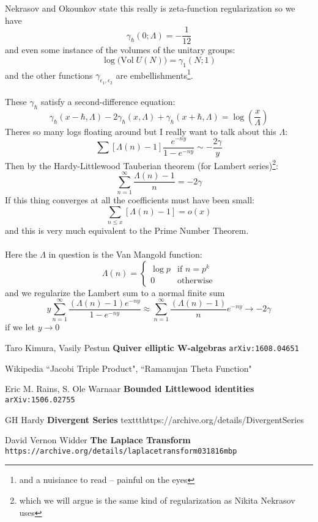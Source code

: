 \documentclass[12pt]{article}
\begin{document}
\noindent Nekrasov and Okounkov state this really is zeta-function regularization so we have
$$ \gamma_{\hbar}(0; \Lambda) = - \frac{1}{12} $$
and even some instance of the volumes of the unitary groups:
$$ \log \big( \text{Vol}\; U(N) \big) = \gamma_1(N; 1)$$ 
and the other functions $\gamma_{\epsilon_1, \epsilon_2}$ are embellishments\footnote{and a nuisiance to read -- painful on the eyes}. \\ \\
These $\gamma_\hbar$ satisfy a second-difference equation:
$$ \gamma_\hbar(x - \hbar, \Lambda  )
- 2\gamma_\hbar(x , \Lambda  )
+ \gamma_\hbar(x + \hbar, \Lambda  )
 = \log \left( \frac{x}{\Lambda} \right)$$
Theres so many logs floating around but I really want to talk about this $\Lambda$:
$$ \sum [\Lambda(n) - 1] \frac{e^{-ny}}{1 - e^{-ny}} \sim - \frac{2\gamma}{y} $$
Then by the Hardy-Littlewood Tauberian theorem (for Lambert series)\footnote{which we will argue is the same kind of regularization as Nikita Nekrasov uses}:
$$ \sum_{n=1}^\infty \frac{\Lambda(n)-1}{n} = - 2\gamma $$
If this thing converges at all the coefficients must have been small:
$$ \sum_{n \leq x} [ \Lambda(n)-1 ] = o(x)$$
and this is very much equivalent to the Prime Number Theorem. \\ \\
Here the $\Lambda$ in question is the Van Mangold function:
$$ \Lambda(n) = \left\{ 
\begin{array}{cl} 
\log p &  \text{if }n = p^k \\
0 & \text{otherwise}
\end{array}
\right. $$
and we regularize the Lambert sum to a normal finite sum
$$ 
y \sum_{n = 1}^\infty \frac{ (\Lambda(n) - 1)e^{-ny}}{1 - e^{-ny}}
\approx 
\sum_{n = 1}^\infty \frac{ (\Lambda(n) - 1)}{n} e^{-ny} \to - 2\gamma
$$
if we let $y \to 0$
\newpage

\selectfont \fontsize{12}{10}\selectfont

\begin{thebibliography}{}

\item Taro Kimura, Vasily Pestun \textbf{Quiver elliptic W-algebras} \texttt{arXiv:1608.04651}
\item Wikipedia ``Jacobi Triple Product", ``Ramanujan Theta Function"
\item Eric M. Rains, S. Ole Warnaar \textbf{Bounded Littlewood identities} \texttt{arXiv:1506.02755}
\item GH Hardy \textbf{Divergent Series} texttt{https://archive.org/details/DivergentSeries}
\item David Vernon Widder \textbf{The Laplace Transform} \texttt{https://archive.org/details/laplacetransform031816mbp}

\end{thebibliography}
\end{document}
